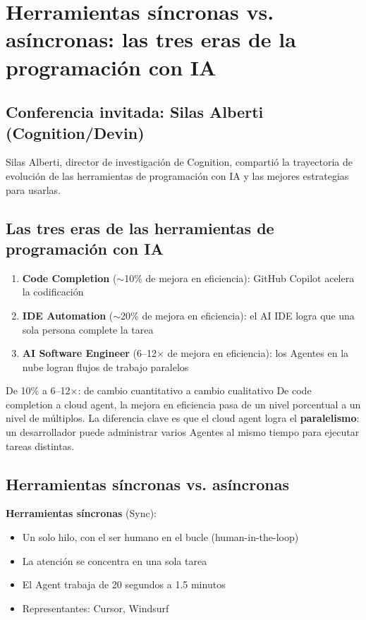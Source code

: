 \section{Herramientas síncronas vs. asíncronas: las tres eras de la programación con IA}

\subsection{Conferencia invitada: Silas Alberti (Cognition/Devin)}

Silas Alberti, director de investigación de Cognition, compartió la trayectoria de evolución de las herramientas de programación con IA y las mejores estrategias para usarlas.

\subsection{Las tres eras de las herramientas de programación con IA}

\begin{enumerate}
    \item \textbf{Code Completion} ($\sim$10\% de mejora en eficiencia): GitHub Copilot acelera la codificación
    \item \textbf{IDE Automation} ($\sim$20\% de mejora en eficiencia): el AI IDE logra que una sola persona complete la tarea
    \item \textbf{AI Software Engineer} (6--12$\times$ de mejora en eficiencia): los Agentes en la nube logran flujos de trabajo paralelos
\end{enumerate}

\begin{importantbox}{De 10\% a 6--12$\times$: de cambio cuantitativo a cambio cualitativo}
De code completion a cloud agent, la mejora en eficiencia pasa de un nivel porcentual a un nivel de múltiplos. La diferencia clave es que el cloud agent logra el \textbf{paralelismo}: un desarrollador puede administrar varios Agentes al mismo tiempo para ejecutar tareas distintas.
\end{importantbox}

\subsection{Herramientas síncronas vs. asíncronas}

\textbf{Herramientas síncronas} (Sync):
\begin{itemize}
    \item Un solo hilo, con el ser humano en el bucle (human-in-the-loop)
    \item La atención se concentra en una sola tarea
    \item El Agent trabaja de 20 segundos a 1.5 minutos
    \item Representantes: Cursor, Windsurf
\end{itemize}


